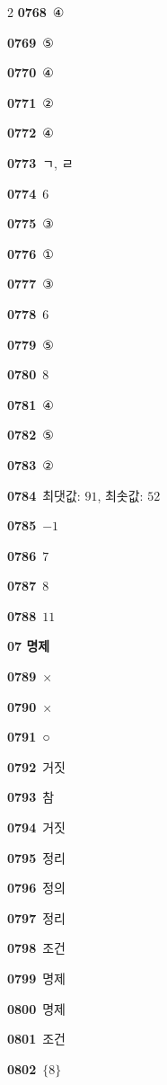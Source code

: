 \documentclass[10pt,a4paper]{article}
\begin{document}
\begin{multicols}{2}
\noindent\textbf{0768}\ ④\par
\noindent\textbf{0769}\ ⑤\par
\noindent\textbf{0770}\ ④\par
\noindent\textbf{0771}\ ②\par
\noindent\textbf{0772}\ ④\par
\noindent\textbf{0773}\ ㄱ, ㄹ\par
\noindent\textbf{0774}\ $6$\par
\noindent\textbf{0775}\ ③\par
\noindent\textbf{0776}\ ①\par
\noindent\textbf{0777}\ ③\par
\noindent\textbf{0778}\ $6$\par
\noindent\textbf{0779}\ ⑤\par
\noindent\textbf{0780}\ $8$\par
\noindent\textbf{0781}\ ④\par
\noindent\textbf{0782}\ ⑤\par
\noindent\textbf{0783}\ ②\par
\noindent\textbf{0784}\ 최댓값: $91$, 최솟값: $52$\par
\noindent\textbf{0785}\ $-1$\par
\noindent\textbf{0786}\ $7$\par
\noindent\textbf{0787}\ $8$\par
\noindent\textbf{0788}\ $11$\par
\noindent\textbf{07 명제}\par\smallskip
\noindent\textbf{0789}\ ×\par
\noindent\textbf{0790}\ ×\par
\noindent\textbf{0791}\ ○\par
\noindent\textbf{0792}\ 거짓\par
\noindent\textbf{0793}\ 참\par
\noindent\textbf{0794}\ 거짓\par
\noindent\textbf{0795}\ 정리\par
\noindent\textbf{0796}\ 정의\par
\noindent\textbf{0797}\ 정리\par
\noindent\textbf{0798}\ 조건\par
\noindent\textbf{0799}\ 명제\par
\noindent\textbf{0800}\ 명제\par
\noindent\textbf{0801}\ 조건\par
\noindent\textbf{0802}\ $\{8\}$\par

\end{multicols}
\end{document}
